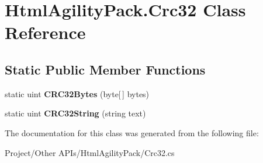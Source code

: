 \hypertarget{class_html_agility_pack_1_1_crc32}{}\section{Html\+Agility\+Pack.\+Crc32 Class Reference}
\label{class_html_agility_pack_1_1_crc32}
\subsection*{Static Public Member Functions}
\begin{DoxyCompactItemize}
\item 
\mbox{\label{class_html_agility_pack_1_1_crc32_aee8657264a2ba7f5e2967cd9efeaa1a0}} 
static uint {\bfseries C\+R\+C32\+Bytes} (byte\mbox{[}$\,$\mbox{]} bytes)
\item 
\mbox{\label{class_html_agility_pack_1_1_crc32_af5d22a9bd82dfb2b9799f43e5a71be78}} 
static uint {\bfseries C\+R\+C32\+String} (string text)
\end{DoxyCompactItemize}


The documentation for this class was generated from the following file\+:\begin{DoxyCompactItemize}
\item 
Project/\+Other A\+P\+Is/\+Html\+Agility\+Pack/Crc32.\+cs\end{DoxyCompactItemize}
